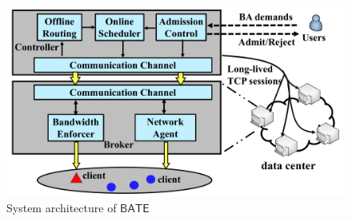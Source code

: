 \documentclass[sigconf]{acmart}
\begin{document}
\begin{figure}
\begin{center}
\includegraphics [width=0.7\columnwidth] {fig/inter-DC-WAN-V3.pdf}
\caption{System architecture of $\mathsf{BATE}$}
\label{pic-overview}
\end{center}
\end{figure}
\end{document}
